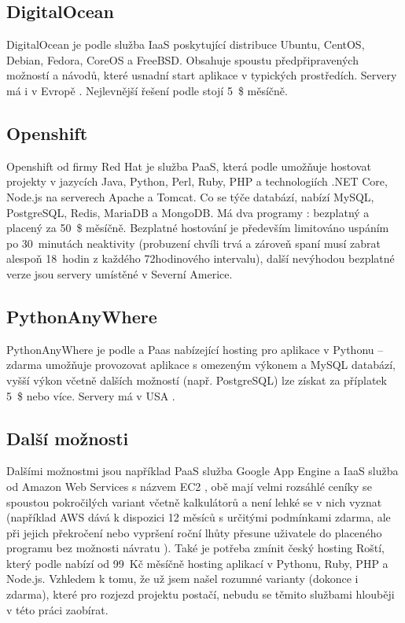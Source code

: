         \subsection{DigitalOcean}
        DigitalOcean je podle \cite{digitalocean1} služba IaaS poskytující distribuce Ubuntu, CentOS, Debian, Fedora, CoreOS a FreeBSD. Obsahuje spoustu předpřipravených možností a návodů, které usnadní start aplikace v typických prostředích. Servery má i v Evropě \cite{digitalocean2}. Nejlevnější řešení podle \cite{digitalocean3} stojí 5~\$ měsíčně.
        
        \subsection{Openshift}
        Openshift od firmy Red Hat je služba PaaS, která podle \cite{openshift1} umožňuje hostovat projekty v jazycích Java, Python, Perl, Ruby, PHP a technologiích .NET Core, Node.js na serverech Apache a Tomcat. Co se týče databází, nabízí MySQL, PostgreSQL, Redis, MariaDB a MongoDB. Má dva programy \cite{openshift2}: bezplatný a placený za 50~\$ měsíčně. Bezplatné hostování je především limitováno uspáním po 30~minutách neaktivity (probuzení chvíli trvá a zároveň spaní musí zabrat alespoň 18~hodin z každého 72hodinového intervalu), další nevýhodou bezplatné verze jsou servery umístěné v Severní Americe.
        
        \subsection{PythonAnyWhere}
        PythonAnyWhere je podle \cite{pythonanywhere1} a \cite{pythonanywhere2} Paas nabízející hosting pro aplikace v Pythonu -- zdarma umožňuje provozovat aplikace s omezeným výkonem a MySQL databází, vyšší výkon včetně dalších možností (např. PostgreSQL) lze získat za příplatek 5~\$ nebo více. Servery má v USA \cite{pythonanywhere3}.
        
        \subsection{Další možnosti}
        Dalšími možnostmi jsou například PaaS služba Google App Engine \cite{googleapp} a IaaS služba od Amazon Web Services s názvem EC2 \cite{aws1}, obě mají velmi rozsáhlé ceníky se spoustou pokročilých variant včetně kalkulátorů a není lehké se v nich vyznat (například AWS dává k dispozici 12 měsíců s určitými podmínkami zdarma, ale při jejich překročení nebo vypršení roční lhůty přesune uživatele do placeného programu bez možnosti návratu \cite{aws2}). Také je potřeba zmínit český hosting Roští, který podle \cite{rosti} nabízí od 99~Kč měsíčně hosting aplikací v Pythonu, Ruby, PHP a Node.js. Vzhledem k tomu, že už jsem našel rozumné varianty (dokonce i zdarma), které pro rozjezd projektu postačí, nebudu se těmito službami hlouběji v této práci zaobírat.

